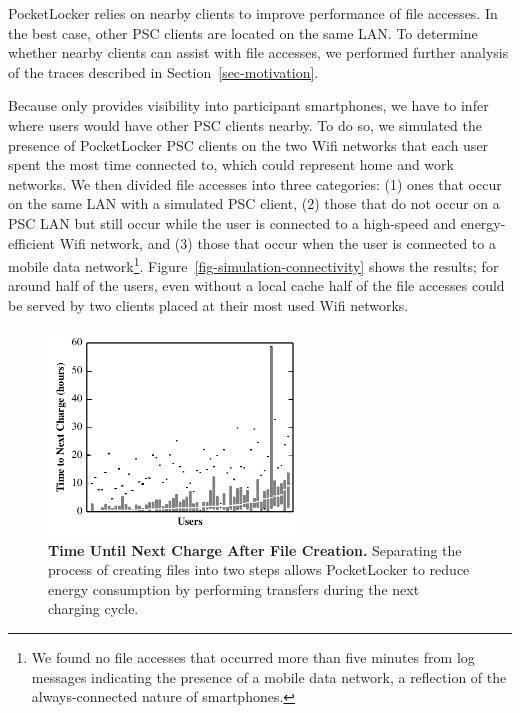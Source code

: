 PocketLocker relies on nearby clients to improve performance of file
accesses. In the best case, other PSC clients are located on the same LAN. To
determine whether nearby clients can assist with file accesses, we performed further
analysis of the traces described in Section~\ref{sec-motivation}.

Because \PhoneLab{} only provides visibility into participant smartphones, we
have to infer where users would have other PSC clients nearby. To do so, we
simulated the presence of PocketLocker PSC clients on the two Wifi networks
that each user spent the most time connected to, which could represent home
and work networks. We then divided file accesses into three categories: (1)
ones that occur on the same LAN with a simulated PSC client, (2) those that
do not occur on a PSC LAN but still occur while the user is connected to a
high-speed and energy-efficient Wifi network, and (3) those that occur when
the user is connected to a mobile data network\footnote{We found no file
  accesses that occurred more than five minutes from log messages indicating
  the presence of a mobile data network, a reflection of the always-connected
nature of smartphones.}. Figure~\ref{fig-simulation-connectivity} shows the
results; for around half of the users, even without a local cache half of the
file accesses could be served by two clients placed at their most
used Wifi networks. 

\begin{figure}

  \vspace*{-0.3in}

  \includegraphics[width=0.6\textwidth]{./figures/pocketlocker/BatteryLengthDistributionGraph.pdf}
  
  \vspace*{-0.1in}

  \caption{\small \textbf{Time Until Next Charge After File Creation.}
    Separating the process of creating files into two steps allows
  PocketLocker to reduce energy consumption by performing transfers during
the next charging cycle.}
  
  \vspace*{-0.2in}

  \label{fig-simulation-battery}

\end{figure}

